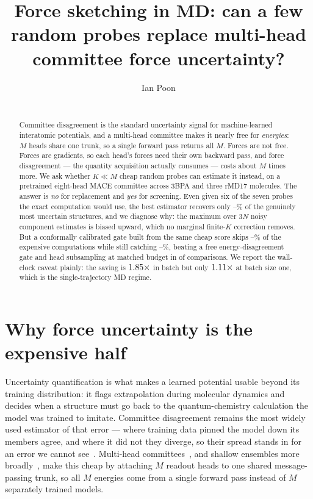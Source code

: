 \documentclass{article}
\title[Force sketching in MD]{Force sketching in MD: can a few random probes replace
multi-head committee force uncertainty?}
\author[I. Poon]{Ian Poon \\
  \institute{Department of Cellular and Molecular Biology \\ Harvard University} \\
  \email{ian\_poon@fas.harvard.edu}}
\begin{document}
\maketitle

\begin{abstract}
Committee disagreement is the standard uncertainty signal for machine-learned interatomic
potentials, and a multi-head committee makes it nearly free for \emph{energies}: $M$ heads share one
trunk, so a single forward pass returns all $M$. Forces are not free. Forces are gradients, so each
head's forces need their own backward pass, and force disagreement --- the quantity acquisition
actually consumes --- costs about $M$ times more. We ask whether $K\ll M$ cheap random probes can
estimate it instead, on a pretrained eight-head MACE committee across 3BPA and three rMD17
molecules. The answer is \emph{no} for replacement and \emph{yes} for screening. Even given six of
the seven probes the exact computation would use, the best estimator recovers only
\fsMaxRecallKSixLoPct--\fsMaxRecallKSixHiPct\% of the genuinely most uncertain structures, and we
diagnose why: the maximum over $3N$ noisy component estimates is biased upward, which no marginal
finite-$K$ correction removes. But a conformally calibrated gate built from the same cheap score
skips \fsGateCVSkipLoPct--\fsGateCVSkipHiPct\% of the expensive computations while still catching
\fsGateCVRecallLoPct--\fsGateCVRecallHiPct\%, beating a free energy-disagreement gate and head
subsampling at matched budget in \fsGateCVDominates{} of \fsGateCVComparisons{} comparisons. We
report the wall-clock caveat plainly: the saving is $1.85\times$ in batch but
only $1.11\times$ at batch size one, which is the single-trajectory MD regime.
\end{abstract}

\section{Why force uncertainty is the expensive half}
Uncertainty quantification is what makes a learned potential usable beyond its training
distribution: it flags extrapolation during molecular dynamics and decides when a structure must go
back to the quantum-chemistry calculation the model was trained to imitate. Committee disagreement
remains the most widely used estimator of that error --- where training data pinned the model down
its members agree, and where it did not they diverge, so their spread stands in for an error we
cannot see~\citep{behler2015,podryabinkin2017,carrete2023}. Multi-head
committees~\citep{beck2025mhc}, and shallow ensembles more broadly~\citep{kellner2024}, make this
cheap by attaching $M$ readout heads to one shared message-passing trunk, so all $M$ energies come
from a single forward pass instead of $M$ separately trained models.
\end{document}
